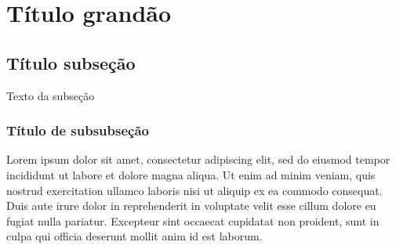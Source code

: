 \documentclass{article}
\begin{document}
	\section[Título pequeno]{Título grand\~ao}
	\subsection{Título subseção}
		Texto da subseção
	\subsubsection{Título de subsubseção}
		Lorem ipsum dolor sit amet, consectetur adipiscing elit, sed do eiusmod tempor incididunt ut labore et dolore magna aliqua. Ut enim ad minim veniam, quis nostrud exercitation ullamco laboris nisi ut aliquip ex ea commodo consequat. Duis aute irure dolor in reprehenderit in voluptate velit esse cillum dolore eu fugiat nulla pariatur. Excepteur sint occaecat cupidatat non proident, sunt in culpa qui officia deserunt mollit anim id est laborum.
\end{document}
